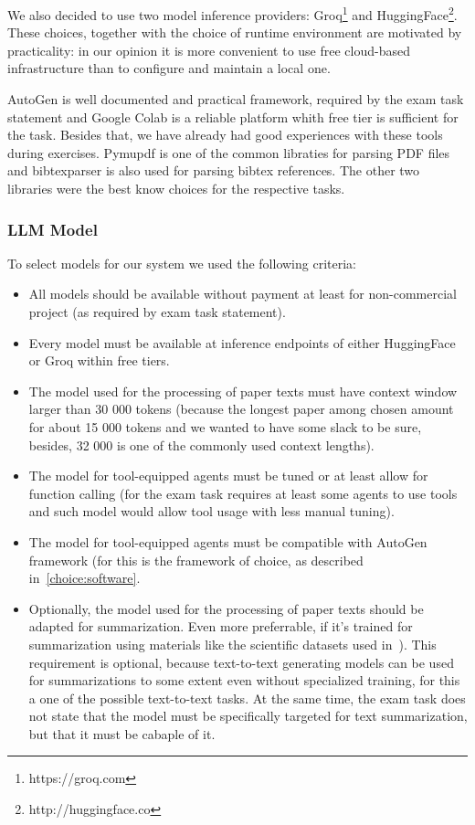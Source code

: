 We also decided to use two model inference providers: Groq\footnote{https://groq.com} and HuggingFace\footnote{http://huggingface.co}. These choices, together with the choice of runtime environment are motivated by practicality: in our opinion it is more convenient to use free cloud-based infrastructure than to configure and maintain a local one.

AutoGen is well documented and practical framework, required by the exam task statement and Google Colab is a reliable platform whith free tier is sufficient for the task. Besides that, we have already had good experiences with these tools during exercises. Pymupdf is one of the common libraties for parsing PDF files and bibtexparser is also used for parsing bibtex references. The other two libraries were the best know choices for the respective tasks.



\subsubsection{LLM Model}
\label{choice:model}

To select models for our system we used the following criteria:

\begin{itemize}
	\item All models should be available without payment at least for non-commercial project  (as required by exam task statement).
	\item Every model must be available at inference endpoints of either HuggingFace or Groq within free tiers.
	\item The model used for the processing of paper texts must have context window larger than 30 000 tokens (because the longest paper among chosen amount for about 15 000 tokens and we wanted to have some slack to be sure, besides, 32 000 is one of the commonly used context lengths).
	\item The model for tool-equipped agents must be tuned or at least allow for function calling (for the exam task requires at least some agents to use tools and such model would allow tool usage with less manual tuning).
	\item The model for tool-equipped agents must be compatible with AutoGen framework (for this is the framework of choice, as described in~\ref{choice:software}.
	\item Optionally, the model used for the processing of paper texts should be adapted for summarization. Even more preferrable, if it's trained for summarization using materials like the scientific datasets used in~\cite{Cohan_2018}). This requirement is optional, because text-to-text generating models can be used for summarizations to some extent even without specialized training, for this a one of the possible text-to-text tasks. At the same time, the exam task does not state that the model must be specifically targeted for text summarization, but that it must be cabaple of it.
\end{itemize}

